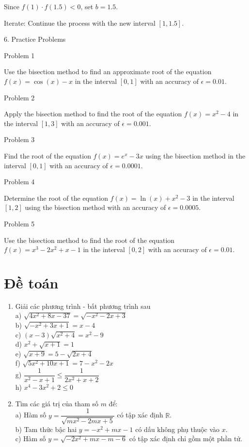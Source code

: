 \documentclass[12pt,a4paper]{article}
\begin{document}
{Since \( f(1) \cdot f(1.5) < 0 \), set \( b = 1.5 \).

Iterate: Continue the process with the new interval \([1, 1.5]\).



6. Practice Problems

Problem 1

Use the bisection method to find an approximate root of the equation \( f(x) = \cos(x) - x \) in the interval \([0, 1]\) with an accuracy of \( \epsilon = 0.01 \).

Problem 2

Apply the bisection method to find the root of the equation \( f(x) = x^2 - 4 \) in the interval \([1, 3]\) with an accuracy of \( \epsilon = 0.001 \).

Problem 3

Find the root of the equation \( f(x) = e^x - 3x \) using the bisection method in the interval \([0, 1]\) with an accuracy of \( \epsilon = 0.0001 \).

Problem 4

Determine the root of the equation \( f(x) = \ln(x) + x^2 - 3 \) in the interval \([1, 2]\) using the bisection method with an accuracy of \( \epsilon = 0.0005 \).

Problem 5

Use the bisection method to find the root of the equation \( f(x) = x^3 - 2x^2 + x - 1 \) in the interval \([0, 2]\) with an accuracy of \( \epsilon = 0.01 \).


\section{Đề toán}
\begin{enumerate}[\bf Câu 1.]
	\item Giải các phương trình - bất phương trình sau\\
a) $\sqrt{4 x^2+8 x-37}=\sqrt{-x^2-2 x+3}$\\
b)	$\sqrt{-x^2+3 x+1}=x-4$\\
c) $(x-3) \sqrt{x^2+4}=x^2-9$\\
d) $x^2+\sqrt{x+1}=1$\\
e) $\sqrt{x+9}=5-\sqrt{2x+4}$\\
f) $\sqrt{5 x^2+10 x+1}=7-x^2-2 x$\\
g) $\dfrac{1}{x^2-x+1} \leq \dfrac{1}{2 x^2+x+2}$\\
h)	$x^4-3 x^2+2 \leq 0$
\item Tìm các giá trị của tham số $m$ để:\\
a) Hàm số $y=\dfrac{1}{\sqrt{m x^2-2 m x+5}}$ có tập xác định $\mathbb{R}$.\\
b) Tam thức bậc hai $y=-x^2+m x-1$ có dấu không phụ thuộc vào $x$.\\
c) Hàm số $y=\sqrt{-2 x^2+m x-m-6}$ có tập xác định chỉ gồm một phần tử.


\end{enumerate}}
\end{document}
